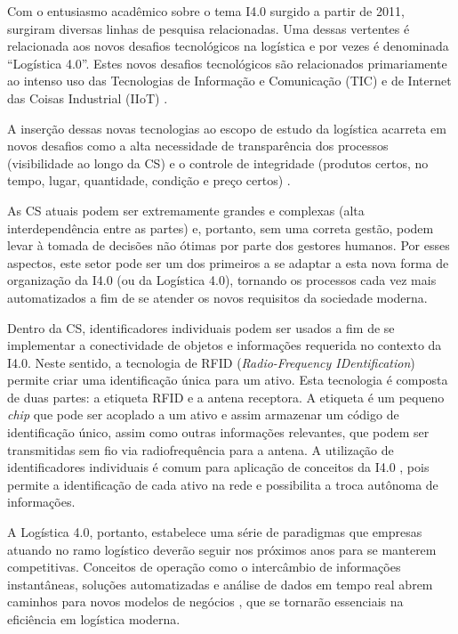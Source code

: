 Com o entusiasmo acadêmico sobre o tema I4.0 surgido a partir de 2011, surgiram diversas linhas de pesquisa relacionadas. Uma dessas vertentes é relacionada aos novos desafios tecnológicos na logística e por vezes é denominada ``Logística 4.0''. Estes novos desafios tecnológicos são relacionados primariamente ao intenso uso das Tecnologias de Informação e Comunicação (TIC) e de Internet das Coisas Industrial (IIoT) \cite{barreto2017industry}.

A inserção dessas novas tecnologias ao escopo de estudo da logística acarreta em novos desafios como a alta necessidade de transparência dos processos (visibilidade ao longo da CS) e o controle de integridade (produtos certos, no tempo, lugar, quantidade, condição e preço certos) \cite{barreto2017industry}.

As CS atuais podem ser extremamente grandes e complexas (alta interdependência entre as partes) e, portanto, sem uma correta gestão, podem levar à tomada de decisões não ótimas por parte dos gestores humanos. Por esses aspectos, este setor pode ser um dos primeiros a se adaptar a esta nova forma de organização da I4.0 (ou da Logística 4.0), tornando os processos cada vez mais automatizados a fim de se atender os novos requisitos da sociedade moderna.

Dentro da CS, identificadores individuais podem ser usados a fim de se implementar a conectividade de objetos e informações requerida no contexto da I4.0. Neste sentido, a tecnologia de RFID (\textit{Radio-Frequency IDentification}) permite criar uma identificação única para um ativo. Esta tecnologia é composta de duas partes: a etiqueta RFID e a antena receptora. A etiqueta é um pequeno \textit{chip} que pode ser acoplado a um ativo e assim armazenar um código de identificação único, assim como outras informações relevantes, que podem ser transmitidas sem fio via radiofrequência para a antena. A utilização de identificadores individuais é comum para aplicação de conceitos da I4.0 \cite{alyahya2016rfidwarehousing, vlachos2014rfidimpact, fan2015inventory, bibi2017rfidfood}, pois permite a identificação de cada ativo na rede e possibilita a troca autônoma de informações.

A Logística 4.0, portanto, estabelece uma série de paradigmas que empresas atuando no ramo logístico deverão seguir nos próximos anos para se manterem competitivas. Conceitos de operação como o intercâmbio de informações instantâneas, soluções automatizadas e análise de dados em tempo real abrem caminhos para novos modelos de negócios \cite{strandhagen2017logistics}, que se tornarão essenciais na eficiência em logística moderna.

